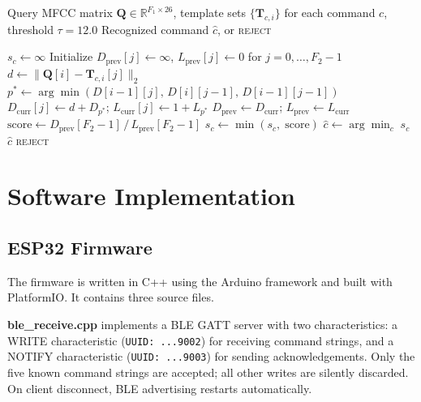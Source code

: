 \documentclass[conference]{IEEEtran}
\begin{document}
\begin{algorithm}[H]
\caption{Voice Command Recognition via DTW + Best-of-N}
\label{alg:dtw}
\begin{algorithmic}[1]
\REQUIRE Query MFCC matrix $\mathbf{Q} \in \mathbb{R}^{F_1 \times 26}$,
         template sets $\{\mathbf{T}_{c,i}\}$ for each command $c$,
         threshold $\tau = 12.0$
\ENSURE Recognized command $\hat{c}$, or \textsc{reject}

  \STATE $s_c \leftarrow \infty$
    \STATE Initialize $D_{\text{prev}}[j] \leftarrow \infty$,
           $L_{\text{prev}}[j] \leftarrow 0$ for $j=0,\ldots,F_2{-}1$
        \STATE $d \leftarrow \|\mathbf{Q}[i] - \mathbf{T}_{c,i}[j]\|_2$
        \STATE $p^* \leftarrow \arg\min(D[i{-}1][j],\,D[i][j{-}1],\,D[i{-}1][j{-}1])$
        \STATE $D_{\text{curr}}[j] \leftarrow d + D_{p^*}$;\quad
               $L_{\text{curr}}[j] \leftarrow 1 + L_{p^*}$
      \ENDFOR
      \STATE $D_{\text{prev}} \leftarrow D_{\text{curr}}$;\quad
             $L_{\text{prev}} \leftarrow L_{\text{curr}}$
    \ENDFOR
    \STATE $\text{score} \leftarrow D_{\text{prev}}[F_2{-}1]\,/\,L_{\text{prev}}[F_2{-}1]$
    \STATE $s_c \leftarrow \min(s_c,\;\text{score})$ \hfill{}
  \ENDFOR
\ENDFOR
\STATE $\hat{c} \leftarrow \arg\min_c\; s_c$
  \RETURN $\hat{c}$
\ELSE
  \RETURN \textsc{reject}
\ENDIF
\end{algorithmic}
\end{algorithm}

\section{Software Implementation} \label{sec:software}

\subsection{ESP32 Firmware}

The firmware is written in C++ using the Arduino framework and built
with PlatformIO. It contains three source files.

\textbf{ble\_receive.cpp} implements a BLE GATT server with two
characteristics: a WRITE characteristic
(\texttt{UUID:~...9002}) for receiving command strings, and a NOTIFY
characteristic (\texttt{UUID:~...9003}) for sending acknowledgements.
Only the five known command strings are accepted; all other writes are
silently discarded. On client disconnect, BLE advertising restarts
automatically.
\end{document}
